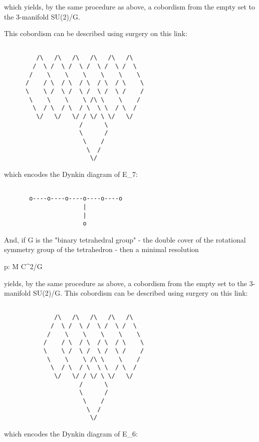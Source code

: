 which yields, by the same procedure as above, a cobordism from the 
empty set to the 3-manifold SU(2)/G.  

This cobordism can be described using surgery on this link:



\begin{verbatim}

         /\   /\   /\   /\   /\   /\ 
        /  \ /  \ /  \ /  \ /  \ /  \
       /    \    \    \    \    \    \   
      /    / \  / \  / \  / \  / \    \ 
      \    \ /  \ /  \ /  \ /  \ /    / 
       \    \    \    \ /\ \    \    /
        \  / \  / \  / \  \ \  / \  /
         \/   \/   \/ / \/ \ \/   \/
                     /      \ 
                     \      /
                      \    /
                       \  /
                        \/ 
\end{verbatim}
    
which encodes the Dynkin diagram of E_{7}:


\begin{verbatim}

       o----o----o----o----o----o
                      |
                      |
                      o
\end{verbatim}
    

And, if G is the "binary tetrahedral group" - the double
cover of the rotational symmetry group of the tetrahedron - then a
minimal resolution

p: M \to  C^{2}/G

yields, by the same procedure as above, a cobordism from the 
empty set to the 3-manifold SU(2)/G.  This cobordism can be 
described using surgery on this link:



\begin{verbatim}

              /\   /\   /\   /\   /\ 
             /  \ /  \ /  \ /  \ /  \
            /    \    \    \    \    \   
           /    / \  / \  / \  / \    \ 
           \    \ /  \ /  \ /  \ /    / 
            \    \    \ /\ \    \    /
             \  / \  / \  \ \  / \  /
              \/   \/ / \/ \ \/   \/
                     /      \ 
                     \      /
                      \    /
                       \  /
                        \/ 
\end{verbatim}
    
which encodes the Dynkin diagram of E_{6}:



